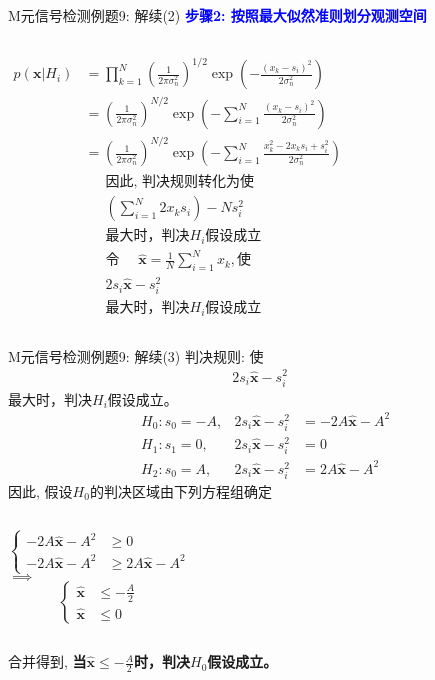 \begin{frame}[shrink]{M元信号检测例题9: 解续(2)}
\textbf{\textcolor{blue}{步骤2: 按照最大似然准则划分观测空间}}
\begin{columns}[T]
	\begin{align*}
	p(\bm{x}|H_i)&=\prod_{k=1}^{N}\left(\frac{1}{2\pi\sigma_n^2}\right)^{1/2}\exp\left(-\frac{(x_k-s_i)^2}{2\sigma_n^2}\right)\\
	&=\left(\frac{1}{2\pi\sigma_n^2}\right)^{N/2}\exp\left(-\sum_{i=1}^{N}\frac{(x_k-s_i)^2}{2\sigma_n^2}\right)\\
	&=\left(\frac{1}{2\pi\sigma_n^2}\right)^{N/2}\exp\left(-\sum_{i=1}^{N}\frac{x_k^2-2x_ks_i+s_i^2}{2\sigma_n^2}\right)
	\end{align*}
	\begin{align*}
	&\text{因此, 判决规则转化为使}\\
	&\left(\sum_{i=1}^{N}2x_ks_i\right)-Ns_i^2\\
    &\text{最大时，判决$H_i$假设成立}\\
	&\text{令 }\quad \bm{\hat{x}}=\frac{1}{N}\sum_{i=1}^{N}x_k, \text{使}\\
	&2s_i\bm{\hat{x}}-s_i^2\\
	&\text{最大时，判决$H_i$假设成立}
	\end{align*}
\end{columns}
\end{frame}

\begin{frame}[shrink]{M元信号检测例题9: 解续(3)}
判决规则: 使
\begin{align*}
2s_i\bm{\hat{x}}-s_i^2
\end{align*}
最大时，判决$H_i$假设成立。
\begin{align*}
&H_0: s_0=-A, &2s_i\bm{\hat{x}}-s_i^2&=-2A\bm{\hat{x}}-A^2\\
&H_1: s_1=0, &2s_i\bm{\hat{x}}-s_i^2&=0\\
&H_2: s_0=A, &2s_i\bm{\hat{x}}-s_i^2&=2A\bm{\hat{x}}-A^2
\end{align*}
因此, 假设$H_0$的判决区域由下列方程组确定
\begin{columns}
	$$
	\begin{cases}
	-2A\bm{\hat{x}}-A^2 &\ge 0\\
	-2A\bm{\hat{x}}-A^2 &\ge 2A\bm{\hat{x}}-A^2
	\end{cases}
	$$
	$\implies$
	$$
	\begin{cases}
	\bm{\hat{x}}&\le -\frac{A}{2}\\
	\bm{\hat{x}}&\le 0
	\end{cases}
	$$
\end{columns}
合并得到, \textbf{当$\bm{\hat{x}}\le -\frac{A}{2}$时，判决$H_0$假设成立。}
\end{frame}

